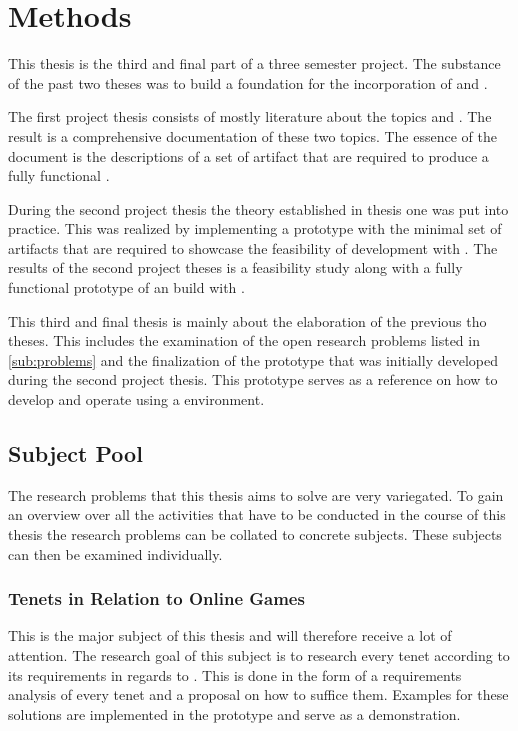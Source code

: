 \chapter{Methods}

This thesis is the third and final part of a three semester project. The
substance of the past two theses was to build a foundation for the incorporation
of \mss{} and \ogs{}. 

The first project thesis consists of mostly literature about the topics \ogs{}
and \mss{}. The result is a comprehensive documentation of these two topics. The
essence of the document is the descriptions of a set of artifact that are
required to produce a fully functional \og{}.

During the second project thesis the theory established in thesis one was put
into practice. This was realized by implementing a prototype with the minimal
set of artifacts that are required to showcase the feasibility of \og{}
development with \mss{}. The results of the second project theses is a
feasibility study along with a fully functional prototype of an \og{} build
with \mss{}.

This third and final thesis is mainly about the elaboration of the previous tho
theses. This includes the examination of the open research problems listed in
\autoref{sub:problems} and the finalization of the prototype that was initially
developed during the second project thesis. This prototype serves as a reference
on how to develop and operate \ogs{} using a \mss{} environment.

\section{Subject Pool}
\label{sec:subject_pool}

The research problems that this thesis aims to solve are very variegated. To
gain an overview over all the activities that have to be conducted in the course
of this thesis the research problems can be collated to concrete subjects. These
subjects can then be examined individually.

\subsection{\ms{} Tenets in Relation to Online Games}

This is the major subject of this thesis and will therefore receive a lot of
attention. The research goal of this subject is to research every \ms{} tenet
according to its requirements in regards to \ogs{}. This is done in the form of
a requirements analysis of every tenet and a proposal on how to suffice them.
Examples for these solutions are implemented in the prototype and serve as a
demonstration. 

